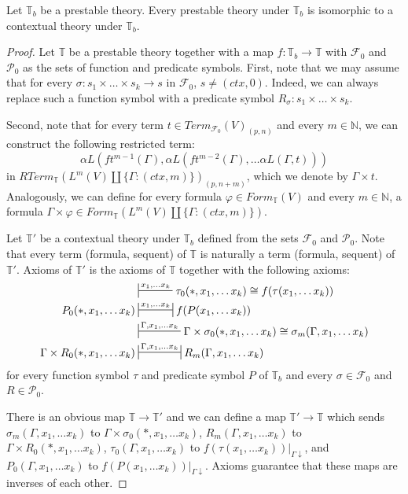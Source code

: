 \documentclass[reqno]{amsart}
\theoremstyle{definition}
\theoremstyle{remark}
\newcommand{\emptyCtx}{*}
\numberwithin{figure}{section}
\begin{document}
\begin{lem}
Let $\mathbb{T}_b$ be a prestable theory.
Every prestable theory under $\mathbb{T}_b$ is isomorphic to a contextual theory under $\mathbb{T}_b$.
\end{lem}
\begin{proof}
Let $\mathbb{T}$ be a prestable theory together with a map $f : \mathbb{T}_b \to \mathbb{T}$ with $\mathcal{F}_0$ and $\mathcal{P}_0$ as the sets of function and predicate symbols.
First, note that we may assume that for every $\sigma : s_1 \times \ldots \times s_k \to s$ in $\mathcal{F}_0$, $s \neq (ctx,0)$.
Indeed, we can always replace such a function symbol with a predicate symbol $R_\sigma : s_1 \times \ldots \times s_k$.

Second, note that for every term $t \in Term_{\mathcal{F}_0}(V)_{(p,n)}$ and every $m \in \mathbb{N}$, we can construct the following restricted term:
\[ \alpha L(ft^{m-1}(\Gamma), \alpha L(ft^{m-2}(\Gamma), \ldots \alpha L(\Gamma, t))) \]
in $RTerm_{\mathbb{T}}(L^m(V) \amalg \{ \Gamma : (ctx,m) \})_{(p,n+m)}$, which we denote by $\Gamma \times t$.
Analogously, we can define for every formula $\varphi \in Form_{\mathbb{T}}(V)$ and every $m \in \mathbb{N}$,
a formula $\Gamma \times \varphi \in Form_{\mathbb{T}}(L^m(V) \amalg \{ \Gamma : (ctx,m) \})$.

Let $\mathbb{T}'$ be a contextual theory under $\mathbb{T}_b$ defined from the sets $\mathcal{F}_0$ and $\mathcal{P}_0$.
Note that every term (formula, sequent) of $\mathbb{T}$ is naturally a term (formula, sequent) of $\mathbb{T}'$.
Axioms of $\mathbb{T}'$ is the axioms of $\mathbb{T}$ together with the following axioms:
\begin{align*}
& \sststile{}{x_1, \ldots x_k} \tau_0(\emptyCtx, x_1, \ldots x_k) \cong f(\tau(x_1, \ldots x_k)) \\
P_0(\emptyCtx, x_1, \ldots x_k) & \ssststile{}{x_1, \ldots x_k} f(P(x_1, \ldots x_k)) \\
& \sststile{}{\Gamma, x_1, \ldots x_k} \Gamma \times \sigma_0(\emptyCtx, x_1, \ldots x_k) \cong \sigma_m(\Gamma, x_1, \ldots x_k) \\
\Gamma \times R_0(\emptyCtx, x_1, \ldots x_k) & \ssststile{}{\Gamma, x_1, \ldots x_k} R_m(\Gamma, x_1, \ldots x_k)
\end{align*}
for every function symbol $\tau$ and predicate symbol $P$ of $\mathbb{T}_b$ and every $\sigma \in \mathcal{F}_0$ and $R \in \mathcal{P}_0$.

There is an obvious map $\mathbb{T} \to \mathbb{T}'$ and we can define a map $\mathbb{T}' \to \mathbb{T}$
which sends $\sigma_m(\Gamma, x_1, \ldots x_k)$ to $\Gamma \times \sigma_0(\emptyCtx, x_1, \ldots x_k)$,
$R_m(\Gamma, x_1, \ldots x_k)$ to $\Gamma \times R_0(\emptyCtx, x_1, \ldots x_k)$,
$\tau_0(\Gamma, x_1, \ldots x_k)$ to $f(\tau(x_1, \ldots x_k))|_{\Gamma\downarrow}$, and $P_0(\Gamma, x_1, \ldots x_k)$ to $f(P(x_1, \ldots x_k))|_{\Gamma\downarrow}$.
Axioms guarantee that these maps are inverses of each other.
\end{proof}
\end{document}
